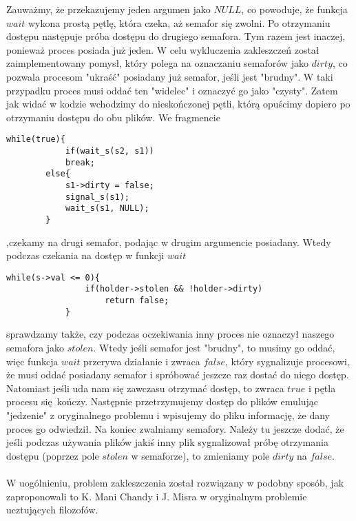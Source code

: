 \documentclass[11pt, wide]{article}
\begin{document}
        Zauważmy, że przekazujemy jeden argumen jako $NULL$, co powoduje, że funkcja $wait$ wykona prostą pętlę, która czeka, aż semafor się zwolni.
        Po otrzymaniu dostępu następuje próba dostępu do drugiego semafora. Tym razem jest inaczej, ponieważ proces posiada już jeden. W celu wykluczenia zakleszczeń
        został zaimplementowany pomysł, który polega na oznaczaniu semaforów jako $dirty$, co pozwala procesom "ukraść" posiadany już semafor, jeśli jest "brudny". W taki przypadku proces musi oddać ten "widelec" i 
        oznaczyć go jako "czysty". Zatem jak widać w kodzie wchodzimy do nieskończonej pętli, którą opuścimy dopiero po 
        otrzymaniu dostępu do obu plików. We fragmencie
        \begin{lstlisting}[style=CStyle]
        while(true){    
            if(wait_s(s2, s1))
            break;
        else{
            s1->dirty = false;
            signal_s(s1);
            wait_s(s1, NULL);
        }\end{lstlisting}
        ,czekamy na drugi semafor, podając w drugim argumencie posiadany.
        Wtedy podczas czekania na dostęp w funkcji $wait$ 
        \begin{lstlisting}[style=CStyle]
            while(s->val <= 0){
                if(holder->stolen && !holder->dirty)
                    return false;
            }\end{lstlisting}
        sprawdzamy także, czy podczas oczekiwania inny proces nie oznaczył naszego semafora jako $stolen$. Wtedy jeśli 
        semafor jest "brudny", to musimy go oddać, więc funkcja $wait$ przerywa działanie i zwraca $false$, który sygnalizuje procesowi, że musi oddać posiadany semafor i spróbować jeszcze raz dostać do niego dostęp. Natomiast
        jeśli uda nam się zawczasu otrzymać dostęp, to zwraca $true$ i pętla procesu się kończy. 
        Następnie przetrzymujemy dostęp do plików emulując "jedzenie" z oryginalnego problemu i wpisujemy do pliku informację, że dany proces go odwiedził.
        Na koniec zwalniamy semafory. Należy tu jeszcze dodać, że jeśli podczas używania plików jakiś inny plik sygnalizował próbę otrzymania dostępu (poprzez pole $stolen$ w semaforze), to 
        zmieniamy pole $dirty$ na $false$.
        \\
        \\
        W uogólnieniu, problem zakleszczenia został rozwiązany w podobny sposób, jak zaproponowali to K. Mani Chandy i J. Misra w oryginalnym problemie ucztujących filozofów.
\end{document}

